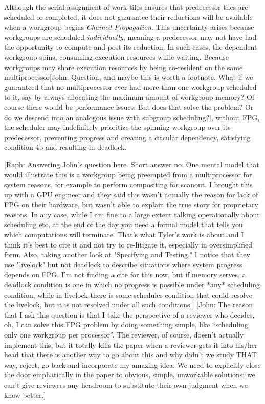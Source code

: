 \documentclass[sigconf]{acmart}
\newcommand{\john}[1]{{\footnotesize\color{cyan}[John: #1]}}
\newcommand{\raph}[1]{{\footnotesize\color{magenta}[Raph: #1]}}
\begin{document}
Although the serial assignment of work tiles ensures that predecessor tiles are scheduled or completed, it does not guarantee their reductions will be available when a workgroup begins \emph{Chained Propagation}. This uncertainty arises because workgroups are scheduled \emph{individually}, meaning a predecessor may not have had the opportunity to compute and post its reduction. In such cases, the dependent workgroup spins, consuming execution resources while waiting. Because workgroups may share execution resources by being co-resident on the same multiprocessor\john{Question, and maybe this is worth a footnote. What if we guaranteed that no multiprocessor ever had more than one workgroup scheduled to it, say by always allocating the maximum amount of workgroup memory? Of course there would be performance issues. But does that solve the problem? Or do we descend into an analogous issue with subgroup scheduling?}, without FPG, the scheduler may indefinitely prioritize the spinning workgroup over its predecessor, preventing progress and creating a circular dependency, satisfying condition 4b and resulting in deadlock.

\raph{Answering John's question here. Short answer no. One mental model that would illustrate this is a workgroup being preempted from a multiprocessor for system reasons, for example to perform compositing for scanout. I brought this up with a GPU engineer and they said this wasn't actually the reason for lack of FPG on their hardware, but wasn't able to explain the true story for proprietary reasons. In any case, while I am fine to a large extent talking operationally about scheduling etc, at the end of the day you need a formal model that tells you which computations will terminate. That's what Tyler's work is about and I think it's best to cite it and not try to re-litigate it, especially in oversimplified form. Also, taking another look at "Specifying and Testing," I notice that they use "livelock" but not deadlock to describe situations where system progress depends on FPG. I'm not finding a cite for this now, but if memory serves, a deadlock condition is one in which no progress is possible under *any* scheduling condition, while in livelock there is some scheduler condition that could resolve the livelock, but it is not resolved under all such conditions.} \john{The reason that I ask this question is that I take the perspective of a reviewer who decides, oh, I can solve this FPG problem by doing something simple, like ``scheduling only one workgroup per processor''. The reviewer, of course, doesn't actually implement this, but it totally kills the paper when a reviewer gets it into his/her head that there is another way to go about this and why didn't we study THAT way, reject, go back and incorporate my amazing idea. We need to explicitly close the door emphatically in the paper to obvious, simple, unworkable solutions; we can't give reviewers any headroom to substitute their own judgment when we know better.}
\end{document}
